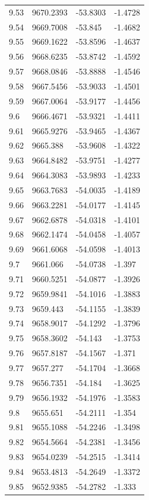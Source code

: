 \begin{table}[H]
\begin{tabular}{llll}
9.53 & 9670.2393 & -53.8303 & -1.4728 \\
9.54 & 9669.7008 & -53.845 & -1.4682 \\
9.55 & 9669.1622 & -53.8596 & -1.4637 \\
9.56 & 9668.6235 & -53.8742 & -1.4592 \\
9.57 & 9668.0846 & -53.8888 & -1.4546 \\
9.58 & 9667.5456 & -53.9033 & -1.4501 \\
9.59 & 9667.0064 & -53.9177 & -1.4456 \\
9.6 & 9666.4671 & -53.9321 & -1.4411 \\
9.61 & 9665.9276 & -53.9465 & -1.4367 \\
9.62 & 9665.388 & -53.9608 & -1.4322 \\
9.63 & 9664.8482 & -53.9751 & -1.4277 \\
9.64 & 9664.3083 & -53.9893 & -1.4233 \\
9.65 & 9663.7683 & -54.0035 & -1.4189 \\
9.66 & 9663.2281 & -54.0177 & -1.4145 \\
9.67 & 9662.6878 & -54.0318 & -1.4101 \\
9.68 & 9662.1474 & -54.0458 & -1.4057 \\
9.69 & 9661.6068 & -54.0598 & -1.4013 \\
9.7 & 9661.066 & -54.0738 & -1.397 \\
9.71 & 9660.5251 & -54.0877 & -1.3926 \\
9.72 & 9659.9841 & -54.1016 & -1.3883 \\
9.73 & 9659.443 & -54.1155 & -1.3839 \\
9.74 & 9658.9017 & -54.1292 & -1.3796 \\
9.75 & 9658.3602 & -54.143 & -1.3753 \\
9.76 & 9657.8187 & -54.1567 & -1.371 \\
9.77 & 9657.277 & -54.1704 & -1.3668 \\
9.78 & 9656.7351 & -54.184 & -1.3625 \\
9.79 & 9656.1932 & -54.1976 & -1.3583 \\
9.8 & 9655.651 & -54.2111 & -1.354 \\
9.81 & 9655.1088 & -54.2246 & -1.3498 \\
9.82 & 9654.5664 & -54.2381 & -1.3456 \\
9.83 & 9654.0239 & -54.2515 & -1.3414 \\
9.84 & 9653.4813 & -54.2649 & -1.3372 \\
9.85 & 9652.9385 & -54.2782 & -1.333 \\

\end{tabular}
\end{table}
